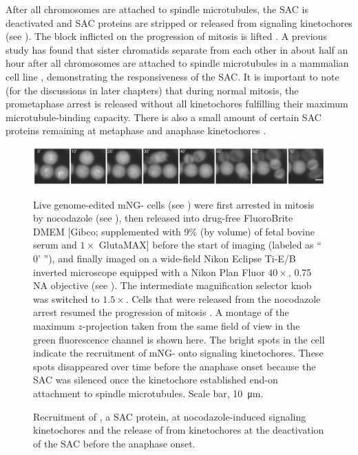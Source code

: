 After all chromosomes are attached to spindle microtubules, the SAC is deactivated and SAC proteins are stripped or released from signaling kinetochores (see ). The block inflicted on the progression of mitosis is lifted \cite{PP2A-B56, DyneinStripsCorona, BubR1MitosisTurnover, CCT-MCCDisassembly, Ubiquitylation-MCCDisassembly, UBR5-MCCDisassembly, TRIP13-p31-MAD2, APC-SUMO}. A previous study has found that sister chromatids separate from each other in about half an hour after all chromosomes are attached to spindle microtubules in a mammalian cell line \cite{RiederNormalProgression}, demonstrating the responsiveness of the SAC. It is important to note (for the discussions in later chapters) that during normal mitosis, the prometaphase arrest is released without all kinetochores fulfilling their maximum microtubule-binding capacity. There is also a small amount of certain SAC proteins remaining at metaphase and anaphase kinetochores \cite{SACSilencing_Etemad2019, SACSilencing_Kuhn2019}.

\begin{figure}
    \centering
    \includegraphics[width=\textwidth]{chapters/figures/mNG-BUBR1_NocWashoutMontage.pdf}
    \caption{Recruitment of , a SAC protein, at nocodazole-induced signaling kinetochores and the release of  from kinetochores at the deactivation of the SAC before the anaphase onset.}
    \noindent\justifying Live genome-edited mNG- cells (see ) were first arrested in mitosis by nocodazole (see ), then released into drug-free FluoroBrite\texttrademark{} DMEM [Gibco; supplemented with 9\% (by volume) of fetal bovine serum and $1\times$ GlutaMAX] before the start of imaging (labeled as `` 0' ''), and finally imaged on a wide-field Nikon Eclipse Ti-E/B inverted microscope equipped with a Nikon Plan Fluor $40\times$, 0.75 NA objective (see ). The intermediate magnification selector knob was switched to $1.5\times$. Cells that were released from the nocodazole arrest resumed the progression of mitosis \cite{Kukreja2020}. A montage of the maximum $z$-projection taken from the same field of view in the green fluorescence channel is shown here. The bright spots in the cell indicate the recruitment of mNG- onto signaling kinetochores. These spots disappeared over time before the anaphase onset because the SAC was silenced once the kinetochore established end-on attachment to spindle microtubules. Scale bar, \SI{10}{\micro m}.
    \label{mNG-BUBR1_NocWashoutMontage}
\end{figure}


